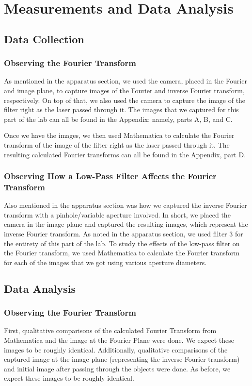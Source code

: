 \documentclass[twocolumn,amsmath,amssymb,pra]{revtex4-2}
\begin{document}
\section{Measurements and Data Analysis}

\subsection{Data Collection}
\subsubsection{Observing the Fourier Transform}
As mentioned in the apparatus section, we used the camera, placed in the Fourier and image plane, to capture images of the Fourier and inverse Fourier transform, respectively. On top of that, we also used the camera to capture the image of the filter right as the laser passed through it. The images that we captured for this part of the lab can all be found in the Appendix; namely, parts A, B, and C.

Once we have the images, we then used Mathematica to calculate the Fourier transform of the image of the filter right as the laser passed through it. The resulting calculated Fourier transforms can all be found in the Appendix, part D.

\subsubsection{Observing How a Low-Pass Filter Affects the Fourier Transform}
Also mentioned in the apparatus section was how we captured the inverse Fourier transform with a pinhole/variable aperture involved. In short, we placed the camera in the image plane and captured the resulting images, which represent the inverse Fourier transform. As noted in the apparatus section, we used filter 3 for the entirety of this part of the lab.  
To study the effects of the low-pass filter on the Fourier transform, we used Mathematica to calculate the Fourier transform for each of the images that we got using various aperture diameters. 

\subsection{Data Analysis}
\subsubsection{Observing the Fourier Transform}
First, qualitative comparisons of the calculated Fourier Transform from Mathematica and the image at the Fourier Plane were done. We expect these images to be roughly identical. Additionally, qualitative comparisons of the captured image at the image plane (representing the inverse Fourier transform) and initial image after passing through the objects were done. As before, we expect these images to be roughly identical.
\end{document}
